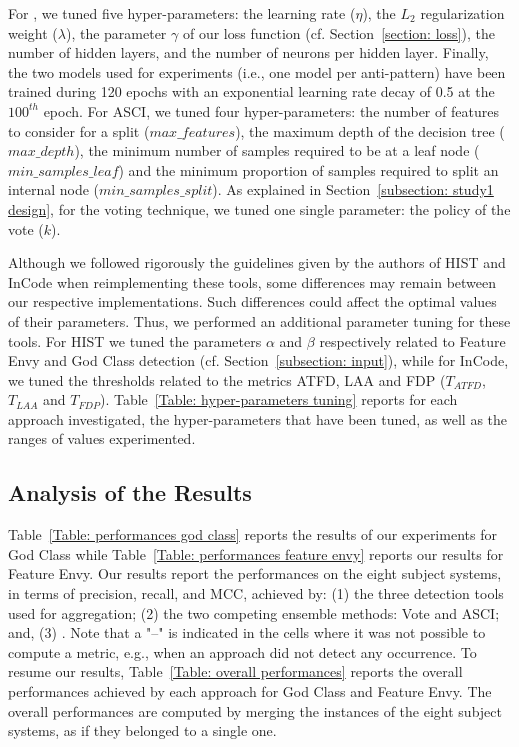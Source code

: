 For \NAME{}, we tuned five hyper-parameters: the learning rate ($\eta$), the $L_{2}$ regularization weight ($\lambda$), the parameter $\gamma$ of our loss function (cf. Section~\ref{section: loss}), the number of hidden layers, and the number of neurons per hidden layer. Finally, the two models used for experiments (i.e., one model per anti-pattern) have been trained during 120 epochs with an exponential learning rate decay of 0.5 at the $100^{th}$ epoch. For ASCI, we tuned four hyper-parameters: the number of features to consider for a split ($max\_features$), the maximum depth of the decision tree ($max\_depth$), the minimum number of samples required to be at a leaf node ($min\_samples\_leaf$) and the minimum proportion of samples required to split an internal node ($min\_samples\_split$). As explained in Section~\ref{subsection: study1 design}, for the voting technique, we tuned one single parameter: the policy of the vote ($k$).

Although we followed rigorously the guidelines given by the authors of HIST and InCode when reimplementing these tools, some differences may remain between our respective implementations. Such differences could affect the optimal values of their parameters. Thus, we performed an additional parameter tuning for these tools. For HIST we tuned the parameters $\alpha$ and $\beta$ respectively related to Feature Envy and God Class detection (cf. Section~\ref{subsection: input}), while for InCode, we tuned the thresholds related to the metrics ATFD, LAA and FDP ($T_{ATFD}$, $T_{LAA}$ and $T_{FDP}$). Table~\ref{Table: hyper-parameters tuning} reports for each approach investigated, the hyper-parameters that have been tuned, as well as the ranges of values experimented.

\subsection{Analysis of the Results}
Table~\ref{Table: performances god class} reports the results of our experiments for God Class while Table~\ref{Table: performances feature envy} reports our results for Feature Envy. Our results report the performances on the eight subject systems, in terms of precision, recall, and MCC, achieved by: (1) the three detection tools used for aggregation; (2) the two competing ensemble methods: Vote and ASCI; and, (3) \NAME{}. Note that a "--" is indicated in the cells where it was not possible to compute a metric, e.g., when an approach did not detect any occurrence. To resume our results, Table~\ref{Table: overall performances} reports the overall performances achieved by each approach for God Class and Feature Envy. The overall performances are computed by merging the instances of the eight subject systems, as if they belonged to a single one.

